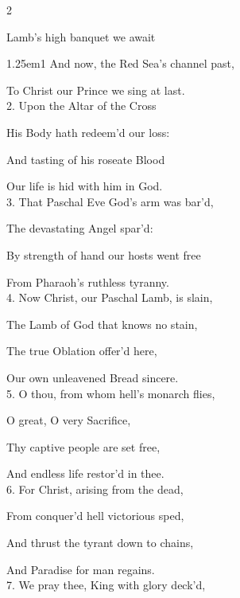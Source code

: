 \secondEvensong


\secondEvensongHymn
\begin{multicols}{2}
\sloppy	

 Lamb’s high banquet we await


\begin{hangparas}{1.25em}{1}
And now, the Red Sea's channel past,

To Christ our Prince we sing at last.\\

2. Upon the Altar of the Cross

His Body hath redeem'd our loss:

And tasting of his roseate Blood

Our life is hid with him in God.\\

3. That Paschal Eve God's arm was bar'd,

The devastating Angel spar'd:

By strength of hand our hosts went free

From Pharaoh's ruthless tyranny.\\

4. Now Christ, our Paschal Lamb, is slain,

The Lamb of God that knows no stain,

The true Oblation offer'd here,

Our own unleavened Bread sincere.\\

5. O thou, from whom hell's monarch flies,

O great, O very Sacrifice,

Thy captive people are set free,

And endless life restor'd in thee.\\

6. For Christ, arising from the dead,

From conquer'd hell victorious sped,

And thrust the tyrant down to chains,

And Paradise for man regains.\\

7. We pray thee, King with glory deck'd,


\end{hangparas}
\end{multicols}
